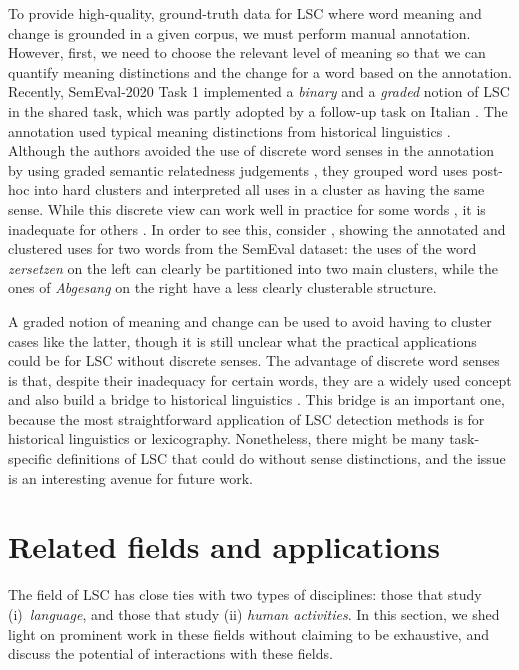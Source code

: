 \documentclass[output=paper]{langscibook}
\begin{document}
To provide high-quality, ground-truth data for LSC where word meaning and change is grounded in a given corpus, we must perform manual annotation. However, first, we need to choose the relevant level of meaning so that we can quantify meaning distinctions and the change for a word based on the annotation.
 Recently, SemEval-2020 Task 1 \citep{schlechtweg-etal-2020-semeval} implemented a \textit{binary} and a \textit{graded} notion of LSC \citep{schlechtwegwalde20} in the shared task, which was partly adopted by a follow-up task on Italian \citep{diacrita_evalita2020}. The annotation used typical meaning distinctions from historical linguistics \citep{blank97xvi}. Although the authors avoided the use of discrete word senses in the annotation by using graded semantic relatedness judgements \citep{erk13,schlechtweg2018durel}, they grouped word uses post-hoc into hard clusters and interpreted all uses in a cluster as having the same sense. 
 While this discrete view can work well in practice for some words \citep{ontonotes2006}, it is inadequate for others \citep{kilgarriff1997,carthy16}. In order to see this, consider , showing the annotated and clustered uses for two words from the SemEval dataset: the uses of the word \textit{zersetzen} on the left can clearly be partitioned into two main clusters, while the ones of \textit{Abgesang} on the right have a less clearly clusterable structure. 

 A graded notion of meaning and change can be used to avoid having to cluster cases like the latter, though it is still unclear what the practical applications could be for LSC without discrete senses. The advantage of discrete word senses is that, despite their inadequacy for certain words, they are a widely used concept and also build a bridge to historical linguistics \citep{blank97xvi,blank1999historical}. 
 This bridge is an important one, because the most straightforward application of LSC detection methods is for historical linguistics or lexicography. Nonetheless, there might be many task-specific definitions of LSC that could do without sense distinctions, and the issue is an interesting avenue for future work. 


\section{Related fields and applications}
\label{s:applications}

The field of LSC has close ties with two types of disciplines: those that study (i)~\emph{language}, and those that study (ii) \emph{human activities}.
In this section, we shed light on prominent work in these fields without claiming to be exhaustive, and discuss the potential of interactions with these fields.
\end{document}
